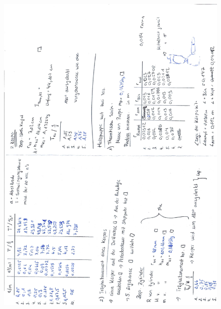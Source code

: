 \begin{flushleft}
\begin{figure}
        \includegraphics[width = 17cm ]{Messdaten/Messdatenanhang2.pdf}
    \end{figure}
\end{flushleft}